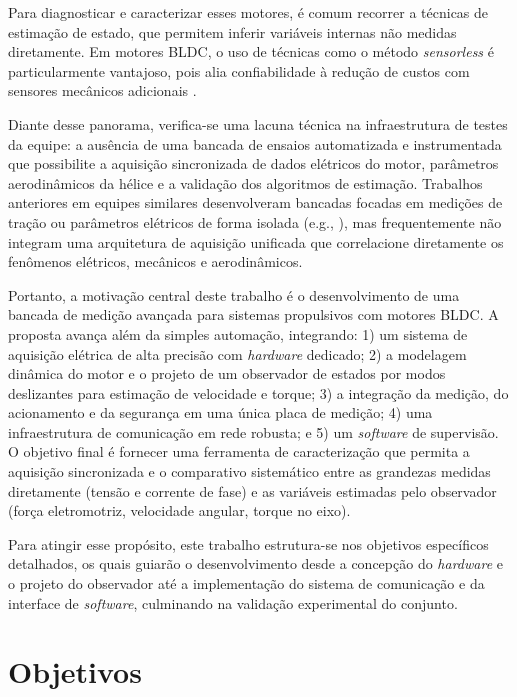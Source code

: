 Para diagnosticar e caracterizar esses motores, é comum recorrer a técnicas de estimação de estado, que permitem inferir variáveis internas não medidas diretamente. Em motores BLDC, o uso de técnicas como o método \textit{sensorless} é particularmente vantajoso, pois alia confiabilidade à redução de custos com sensores mecânicos adicionais \cite{Krishnan2017}.

Diante desse panorama, verifica-se uma lacuna técnica na infraestrutura de testes da equipe: a ausência de uma bancada de ensaios automatizada e instrumentada que possibilite a aquisição sincronizada de dados elétricos do motor, parâmetros aerodinâmicos da hélice e a validação dos algoritmos de estimação. Trabalhos anteriores em equipes similares desenvolveram bancadas focadas em medições de tração ou parâmetros elétricos de forma isolada (e.g., \cite{Costa2021}), mas frequentemente não integram uma arquitetura de aquisição unificada que correlacione diretamente os fenômenos elétricos, mecânicos e aerodinâmicos.

Portanto, a motivação central deste trabalho é o desenvolvimento de uma bancada de medição avançada para sistemas propulsivos com motores BLDC. A proposta avança além da simples automação, integrando: 1) um sistema de aquisição elétrica de alta precisão com \textit{hardware} dedicado; 2) a modelagem dinâmica do motor e o projeto de um observador de estados por modos deslizantes para estimação de velocidade e torque; 3) a integração da medição, do acionamento e da segurança em uma única placa de medição; 4) uma infraestrutura de comunicação em rede robusta; e 5) um \textit{software} de supervisão. O objetivo final é fornecer uma ferramenta de caracterização que permita a aquisição sincronizada e o comparativo sistemático entre as grandezas medidas diretamente (tensão e corrente de fase) e as variáveis estimadas pelo observador (força eletromotriz, velocidade angular, torque no eixo).

Para atingir esse propósito, este trabalho estrutura-se nos objetivos específicos detalhados, os quais guiarão o desenvolvimento desde a concepção do \textit{hardware} e o projeto do observador até a implementação do sistema de comunicação e da interface de \textit{software}, culminando na validação experimental do conjunto.

\newpage
\section{Objetivos}

